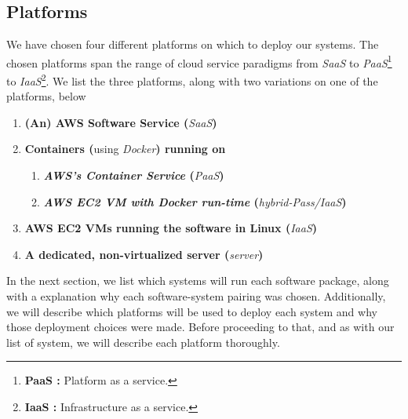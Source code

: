 \documentclass{article}[12pt]
\numberwithin{equation}{section}
\begin{document}
\begin{flushleft}


\subsection{Platforms}
\begin{spacing}{1.5}
	We have chosen four different platforms on which to deploy our systems.  The chosen platforms span the range of cloud service paradigms from \emph{SaaS} to \emph{PaaS}\footnote{\textbf{PaaS :} Platform as a service.} to \emph{IaaS}\footnote{\textbf{IaaS :} Infrastructure as a service.}.  We list the three platforms, along with two variations on one of the platforms, below
	
	
	\begin{enumerate}[label=\large{\textbf{\arabic*}):}]
		\item \textbf{(An) AWS Software Service (}\emph{SaaS}\textbf{)}
		\item \textbf{Containers (}using \emph{Docker}\textbf{) running on}
		
		\begin{enumerate}[label=\large{\textbf{\roman*}):}]
			\item \textbf{\emph{AWS's Container Service} (}\emph{PaaS}\textbf{)}
			\item \textbf{\emph{AWS EC2 VM with Docker run-time} (}\emph{hybrid-Pass/IaaS}\textbf{)}
		\end{enumerate}
		\vspace{0.025in}
		
		\item \textbf{AWS EC2 VMs running the software in Linux (}\emph{IaaS}\textbf{)}
		\item \textbf{A dedicated, non-virtualized server (}\emph{server}\textbf{)}
	\end{enumerate}
	
	
	In the next section, we list which systems will run each software package, along with a explanation why each software-system pairing was chosen.  Additionally, we will describe which platforms will be used to deploy each system and why those deployment choices were made.  Before proceeding to that, and as with our list of system, we will describe each platform thoroughly.
\end{spacing}



\end{flushleft}
\end{document}
